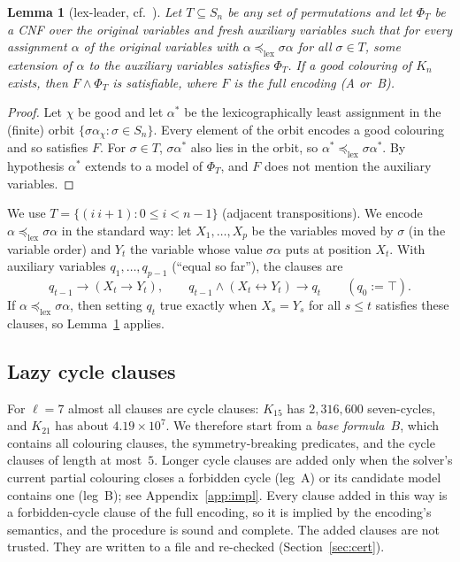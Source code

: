 \documentclass[11pt]{amsart}
\newtheorem{lemma}[theorem]{Lemma}
\theoremstyle{definition}
\theoremstyle{remark}
\newcommand{\lexle}{\preceq_{\mathrm{lex}}}
\begin{document}
\begin{lemma}[lex-leader, cf.~\cite{CGLR}]\label{lem:lexleader}
Let $T\subseteq S_n$ be any set of permutations and let $\Phi_T$ be a CNF over the original variables and fresh auxiliary variables such
that for every assignment $\alpha$ of the original variables with $\alpha\lexle\sigma\alpha$ for all $\sigma\in T$, some extension of
$\alpha$ to the auxiliary variables satisfies $\Phi_T$. If a good colouring of $K_n$ exists, then $F\wedge\Phi_T$ is satisfiable,
where $F$ is the full encoding (A or~B).
\end{lemma}
\begin{proof}
Let $\chi$ be good and let $\alpha^*$ be the lexicographically least assignment in the (finite) orbit $\{\sigma\alpha_\chi:\sigma\in
S_n\}$. Every element of the orbit encodes a good colouring and so satisfies $F$. For $\sigma\in T$, $\sigma\alpha^*$ also lies in the orbit, so
$\alpha^*\lexle\sigma\alpha^*$. By hypothesis $\alpha^*$ extends to a model of $\Phi_T$, and $F$ does not mention the auxiliary variables.
\end{proof}

We use $T=\{(i\ i{+}1):0\le i<n-1\}$ (adjacent transpositions). We encode $\alpha\lexle\sigma\alpha$ in the standard way: let
$X_1,\dots,X_p$ be the variables moved by $\sigma$ (in the variable order) and $Y_t$ the variable whose value $\sigma\alpha$ puts at
position $X_t$. With auxiliary variables $q_1,\dots,q_{p-1}$ (``equal so far''), the clauses are
\[
q_{t-1}\rightarrow(X_t\rightarrow Y_t),\qquad q_{t-1}\wedge(X_t\leftrightarrow Y_t)\rightarrow q_t\qquad(q_0:=\top).
\]
If $\alpha\lexle\sigma\alpha$, then setting $q_t$ true exactly when $X_s=Y_s$ for all $s\le t$ satisfies these clauses, so
Lemma~\ref{lem:lexleader} applies.

\subsection{Lazy cycle clauses}
For $\ell=7$ almost all clauses are cycle clauses: $K_{15}$ has $2{,}316{,}600$ seven-cycles, and $K_{21}$ has about
$4.19\times10^7$. We therefore start from a \emph{base formula}~$B$, which contains all colouring clauses, the symmetry-breaking
predicates, and the cycle clauses of length at most~$5$. Longer cycle clauses are added only when the solver's current partial
colouring closes a forbidden cycle (leg~A) or its candidate model contains one (leg~B); see Appendix~\ref{app:impl}. Every clause
added in this way is a forbidden-cycle clause of the full encoding, so it is implied by the encoding's semantics, and the procedure
is sound and complete. The added clauses are not trusted. They are written to a file and re-checked (Section~\ref{sec:cert}).
\end{document}
